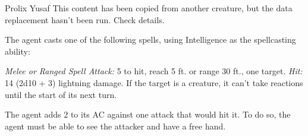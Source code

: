 \documentclass[10pt,a4paper,twoside,bg=print,twocolumn,openany,nodeprecatedcode]{dndbook}
\begin{document}
\begin{DndMonster}[float=t]{Prolix Yusaf}
\DndMonsterBasics[
armor-class = {11},
hit-points = {\DndDice{4d8 + 4}},
speed = {30 ft.}
]
\DndMonsterAbilityScores[
 str = 10,
 dex = 12,
 con = 12,
 int = 16,
 wis = 12,
 cha = 10
]
\DndMonsterDetails[
saving-throws = {Int +5},
skills = {Arcana +5, History +5, Investigation +5},
languages = {Common plus one other language},
challenge = 1,
]
This content has been copied from another creature, but the data replacement hasn't been run. Check details.

The agent casts one of the following spells, using Intelligence as the spellcasting ability:
\begin{DndMonsterSpells}
\end{DndMonsterSpells}
\textsl{Melee or Ranged Spell Attack:} 5 to hit, reach 5 ft. or range 30 ft., one target. \textsl{Hit:} 14 (2d10 + 3) lightning damage. If the target is a creature, it can't take reactions until the start of its next turn.

The agent adds 2 to its AC against one attack that would hit it. To do so, the agent must be able to see the attacker and have a free hand.

\end{DndMonster}
\end{document}
